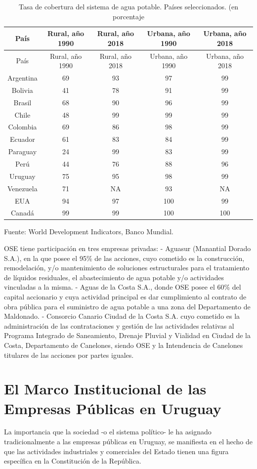 \documentclass[
  12pt,
  spanish,
]{book}
\begin{document}
\begin{longtable}[]{@{}ccccc@{}}
\caption{Tasa de cobertura del sistema de agua potable. Países
seleccionados. (en porcentaje}\tabularnewline
\toprule
País & Rural, año 1990 & Rural, año 2018 & Urbana, año 1990 & Urbana,
año 2018\tabularnewline
\midrule
\endfirsthead
\toprule
País & Rural, año 1990 & Rural, año 2018 & Urbana, año 1990 & Urbana,
año 2018\tabularnewline
\midrule
\endhead
Argentina & 69 & 93 & 97 & 99\tabularnewline
Bolivia & 41 & 78 & 91 & 99\tabularnewline
Brasil & 68 & 90 & 96 & 99\tabularnewline
Chile & 48 & 99 & 99 & 99\tabularnewline
Colombia & 69 & 86 & 98 & 99\tabularnewline
Ecuador & 61 & 83 & 84 & 99\tabularnewline
Paraguay & 24 & 99 & 83 & 99\tabularnewline
Perú & 44 & 76 & 88 & 96\tabularnewline
Uruguay & 75 & 95 & 98 & 99\tabularnewline
Venezuela & 71 & NA & 93 & NA\tabularnewline
EUA & 94 & 97 & 100 & 99\tabularnewline
Canadá & 99 & 99 & 100 & 100\tabularnewline
\bottomrule
\end{longtable}

Fuente: World Development Indicators, Banco Mundial.

OSE tiene participación en tres empresas privadas: - Aguasur (Manantial
Dorado S.A.), en la que posee el 95\% de las acciones, cuyo cometido es
la construcción, remodelación, y/o mantenimiento de soluciones
estructurales para el tratamiento de líquidos residuales, el
abastecimiento de agua potable y/o actividades vinculadas a la misma. -
Aguas de la Costa S.A., donde OSE posee el 60\% del capital accionario y
cuya actividad principal es dar cumplimiento al contrato de obra pública
para el suministro de agua potable a una zona del Departamento de
Maldonado. - Consorcio Canario Ciudad de la Costa S.A. cuyo cometido es
la administración de las contrataciones y gestión de las actividades
relativas al Programa Integrado de Saneamiento, Drenaje Pluvial y
Vialidad en Ciudad de la Costa, Departamento de Canelones, siendo OSE y
la Intendencia de Canelones titulares de las acciones por partes
iguales.

\hypertarget{el-marco-institucional-de-las-empresas-puxfablicas-en-uruguay}{%
\section{El Marco Institucional de las Empresas Públicas en
Uruguay}\label{el-marco-institucional-de-las-empresas-puxfablicas-en-uruguay}}

La importancia que la sociedad -o el sistema político- le ha asignado
tradicionalmente a las empresas públicas en Uruguay, se manifiesta en el
hecho de que las actividades industriales y comerciales del Estado
tienen una figura específica en la Constitución de la República.
\end{document}
